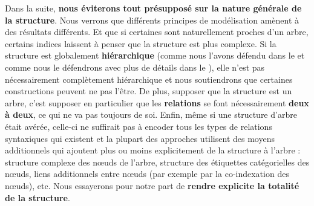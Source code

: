 Dans la suite, \textbf{nous éviterons tout présupposé sur la nature générale de la structure}. Nous verrons que différents principes de modélisation amènent à des résultats différents. Et que si certaines sont naturellement proches d’un arbre, certains indices laissent à penser que la structure est plus complexe. Si la structure est globalement \textbf{hiérarchique} (comme nous l’avons défendu dans le  et comme nous le défendrons avec plus de détails dans le ), elle n’est pas nécessairement complètement hiérarchique et nous soutiendrons que certaines constructions peuvent ne pas l’être. De plus, supposer que la structure est un arbre, c’est supposer en particulier que les \textbf{relations} se font nécessairement \textbf{deux à deux}, ce qui ne va pas toujours de soi. Enfin, même si une structure d’arbre était avérée, celle-ci ne suffirait pas à encoder tous les types de relations syntaxiques qui existent et la plupart des approches utilisent des moyens additionnels qui ajoutent plus ou moins explicitement de la structure à l’arbre : structure complexe des nœuds de l’arbre, structure des étiquettes catégorielles des nœuds, liens additionnels entre nœuds (par exemple par la co-indexation des nœuds), etc. Nous essayerons pour notre part de \textbf{rendre explicite la totalité de la structure}.

